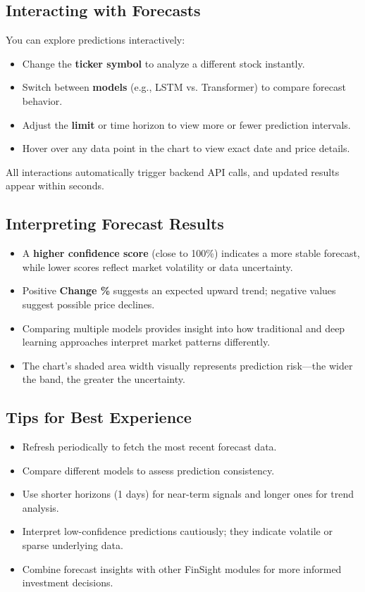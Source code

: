 \subsection{Interacting with Forecasts}

You can explore predictions interactively:
\begin{itemize}
  \item Change the \textbf{ticker symbol} to analyze a different stock instantly.
  \item Switch between \textbf{models} (e.g., LSTM vs. Transformer) to compare forecast behavior.
  \item Adjust the \textbf{limit} or time horizon to view more or fewer prediction intervals.
  \item Hover over any data point in the chart to view exact date and price details.
\end{itemize}

All interactions automatically trigger backend API calls, and updated results appear within seconds.

\subsection{Interpreting Forecast Results}

\begin{itemize}
  \item A \textbf{higher confidence score} (close to 100\%) indicates a more stable forecast, while lower scores reflect market volatility or data uncertainty.
  \item Positive \textbf{Change \%} suggests an expected upward trend; negative values suggest possible price declines.
  \item Comparing multiple models provides insight into how traditional and deep learning approaches interpret market patterns differently.
  \item The chart’s shaded area width visually represents prediction risk—the wider the band, the greater the uncertainty.
\end{itemize}

\subsection{Tips for Best Experience}

\begin{itemize}
  \item Refresh periodically to fetch the most recent forecast data.
  \item Compare different models to assess prediction consistency.
  \item Use shorter horizons (1 days) for near-term signals and longer ones for trend analysis.
  \item Interpret low-confidence predictions cautiously; they indicate volatile or sparse underlying data.
  \item Combine forecast insights with other FinSight modules for more informed investment decisions.
\end{itemize}




